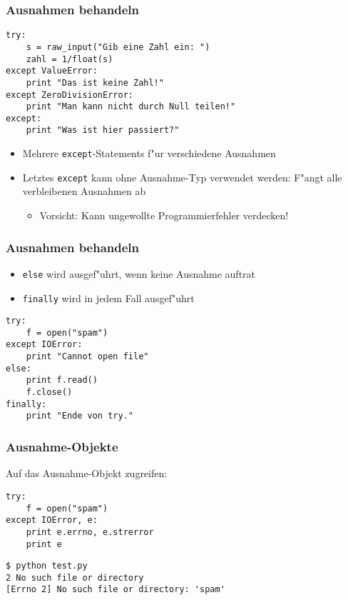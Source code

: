 \begin{frame}[fragile]
\frametitle{Ausnahmen behandeln}
\begin{lstlisting}[style=Python]
try:
    s = raw_input("Gib eine Zahl ein: ")
    zahl = 1/float(s)
except ValueError:
    print "Das ist keine Zahl!"
except ZeroDivisionError:
    print "Man kann nicht durch Null teilen!"
except:
    print "Was ist hier passiert?"
\end{lstlisting}
\begin{itemize}
\item Mehrere \texttt{except}-Statements f"ur verschiedene Ausnahmen
\item Letztes \texttt{except} kann ohne Ausnahme-Typ verwendet werden: F"angt alle verbleibenen Ausnahmen ab
\begin{itemize}
\item Vorsicht: Kann ungewollte Programmierfehler verdecken!
\end{itemize}
\end{itemize}
\end{frame}

\begin{frame}[fragile]
\frametitle{Ausnahmen behandeln}
\begin{itemize}
\item \alert{\texttt{else}} wird ausgef"uhrt, wenn keine Ausnahme auftrat
\item \alert{\texttt{finally}} wird in \alert{jedem} Fall ausgef"uhrt
\end{itemize}
\begin{lstlisting}[style=Python]
try:
    f = open("spam")
except IOError:
    print "Cannot open file"
else:
    print f.read()
    f.close()
finally:
    print "Ende von try."
\end{lstlisting}
\end{frame}

\begin{frame}[fragile]
\frametitle{Ausnahme-Objekte}
Auf das Ausnahme-Objekt zugreifen:
\begin{lstlisting}[style=Python]
try:
    f = open("spam")
except IOError, e:
    print e.errno, e.strerror
    print e
\end{lstlisting}
\begin{lstlisting}[style=Shell]
$ python test.py
2 No such file or directory
[Errno 2] No such file or directory: 'spam'
\end{lstlisting}%
\end{frame}

